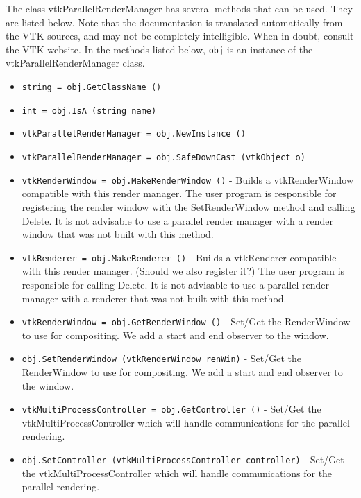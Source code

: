 The class vtkParallelRenderManager has several methods that can be used.
  They are listed below.
Note that the documentation is translated automatically from the VTK sources,
and may not be completely intelligible.  When in doubt, consult the VTK website.
In the methods listed below, \verb|obj| is an instance of the vtkParallelRenderManager class.
\begin{itemize}
\item  \verb|string = obj.GetClassName ()|

\item  \verb|int = obj.IsA (string name)|

\item  \verb|vtkParallelRenderManager = obj.NewInstance ()|

\item  \verb|vtkParallelRenderManager = obj.SafeDownCast (vtkObject o)|

\item  \verb|vtkRenderWindow = obj.MakeRenderWindow ()| -  Builds a vtkRenderWindow compatible with this render manager.  The
 user program is responsible for registering the render window with the
 SetRenderWindow method and calling Delete.  It is not advisable to use
 a parallel render manager with a render window that was not built with
 this method.

\item  \verb|vtkRenderer = obj.MakeRenderer ()| -  Builds a vtkRenderer compatible with this render manager.  (Should we
 also register it?)  The user program is responsible for calling
 Delete.  It is not advisable to use a parallel render manager with a
 renderer that was not built with this method.

\item  \verb|vtkRenderWindow = obj.GetRenderWindow ()| -  Set/Get the RenderWindow to use for compositing.
 We add a start and end observer to the window.

\item  \verb|obj.SetRenderWindow (vtkRenderWindow renWin)| -  Set/Get the RenderWindow to use for compositing.
 We add a start and end observer to the window.

\item  \verb|vtkMultiProcessController = obj.GetController ()| -  Set/Get the vtkMultiProcessController which will handle communications
 for the parallel rendering.

\item  \verb|obj.SetController (vtkMultiProcessController controller)| -  Set/Get the vtkMultiProcessController which will handle communications
 for the parallel rendering.


\end{itemize}
